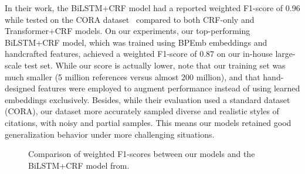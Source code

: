 In their work, the BiLSTM+CRF model had a reported weighted F1-score of 0.96 while tested on the CORA dataset~\cite{ArchComapre} compared to both CRF-only and Transformer+CRF models. On our experiments, our top-performing BiLSTM+CRF model, which was trained using BPEmb embeddings and handcrafted features, achieved a weighted F1-score of 0.87 on our in-house large-scale test set. While our score is actually lower, note that our training set was much smaller (5 million references versus almost 200  million), and that hand-designed features were employed to augment performance instead of using learned embeddings exclusively.
Besides, while their evaluation used a standard dataset (CORA), our dataset more accurately sampled diverse and realistic styles of citations, with noisy and partial samples. This means our models retained good generalization behavior under more challenging situations.
\begin{figure}[H]
    \centering
    
    \caption[Comparison of Weighted F1-Scores with External Published Work]{Comparison of weighted F1-scores between our models and the BiLSTM+CRF model from\cite{ArchComapre}.}
    \label{fig:external_comparison}
\end{figure}



